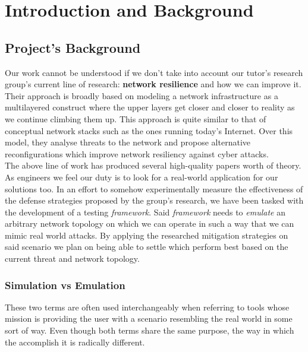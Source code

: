 \chapter{Introduction and Background}
    \section{Project's Background}
        Our work cannot be understood if we don't take into account our tutor's research group's current line of research: \textbf{network resilience} and how we can improve it. Their approach is broadly based on modeling a network infrastructure as a multilayered construct where the upper layers get closer and closer to reality as we continue climbing them up. This approach is quite similar to that of conceptual network stacks such as the ones running today's Internet. Over this model, they analyse threats to the network and propose alternative reconfigurations which improve network resiliency against cyber attacks.\\

        The above line of work has produced several high-quality papers worth of theory. As engineers we feel our duty is to look for a real-world application for our solutions too. In an effort to somehow experimentally measure the effectiveness of the defense strategies proposed by the group's research, we have been tasked with the development of a testing \textit{framework}. Said \textit{framework} needs to \textit{emulate} an arbitrary network topology on which we can operate in such a way that we can mimic real world attacks. By applying the researched mitigation strategies on said scenario we plan on being able to settle which perform best based on the current threat and network topology.\\

        \subsection{Simulation vs Emulation}
            These two terms are often used interchangeably when referring to tools whose mission is providing the user with a scenario resembling the real world in some sort of way. Even though both terms share the same purpose, the way in which the accomplish it is radically different.\\

